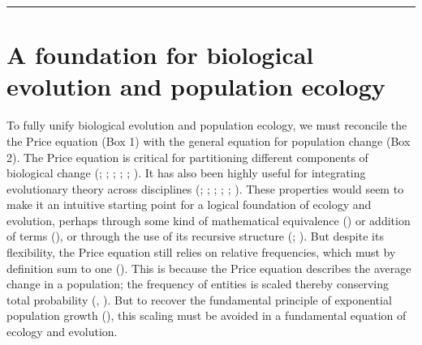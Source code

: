 \documentclass[
]{article}
\begin{document}
\begin{center}\rule{0.5\linewidth}{0.5pt}\end{center}

\section{A foundation for biological evolution and population
ecology}\label{a-foundation-for-biological-evolution-and-population-ecology}

To fully unify biological evolution and population ecology, we must
reconcile the the Price equation (Box 1) with the general equation for
population change (Box 2). The Price equation is critical for
partitioning different components of biological change
(; ; ;
; ; ). It has also been
highly useful for integrating evolutionary theory across disciplines
(;
;
;
; ; ). These
properties would seem to make it an intuitive starting point for a
logical foundation of ecology and evolution, perhaps through some kind
of mathematical equivalence () or addition of terms (), or through the use of its recursive structure
(;
). But despite its flexibility, the
Price equation still relies on relative frequencies, which must by
definition sum to one (). This is
because the Price equation describes the average change in a population;
the frequency of entities is scaled thereby conserving total probability
(, ).
But to recover the fundamental principle of exponential population
growth (), this scaling must be
avoided in a fundamental equation of ecology and evolution.
\end{document}
